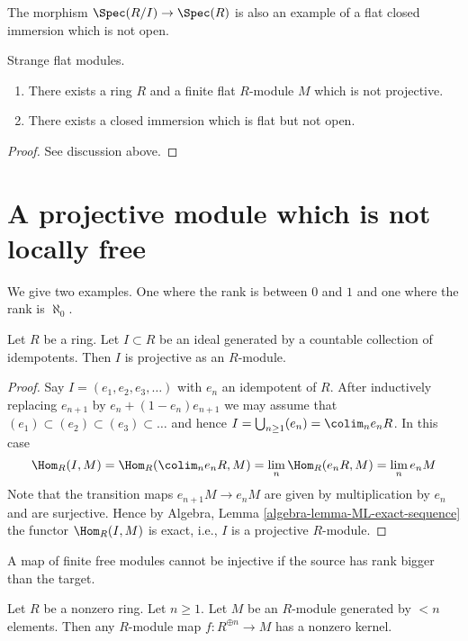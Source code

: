 \medskip\noindent
The morphism $\Spec(R/I) \to \Spec(R)$ is also
an example of a flat closed immersion which is not open.

\begin{lemma}
\label{lemma-finite-flat-non-projective}
Strange flat modules.
\begin{enumerate}
\item There exists a ring $R$ and a finite flat $R$-module $M$ which is
not projective.
\item There exists a closed immersion which is flat but not open.
\end{enumerate}
\end{lemma}

\begin{proof}
See discussion above.
\end{proof}



\section{A projective module which is not locally free}
\label{section-projective-not-locally-free}

\noindent
We give two examples. One where the rank is between $0$ and $1$
and one where the rank is $\aleph_0$.

\begin{lemma}
\label{lemma-ideal-generated-by-idempotents-projective}
Let $R$ be a ring. Let $I \subset R$ be an ideal generated by
a countable collection of idempotents. Then $I$ is projective
as an $R$-module.
\end{lemma}

\begin{proof}
Say $I = (e_1, e_2, e_3, \ldots)$ with $e_n$ an idempotent of $R$.
After inductively replacing $e_{n + 1}$ by $e_n + (1 - e_n)e_{n + 1}$
we may assume that $(e_1) \subset (e_2) \subset (e_3) \subset \ldots$
and hence $I = \bigcup_{n \geq 1} (e_n) = \colim_n e_nR$.
In this case
$$
\Hom_R(I, M) = \Hom_R(\colim_n e_nR, M)
= \lim_n \Hom_R(e_nR, M) = \lim_n e_nM
$$
Note that the transition maps $e_{n + 1}M \to e_nM$ are given
by multiplication by $e_n$ and are surjective. Hence by
Algebra, Lemma \ref{algebra-lemma-ML-exact-sequence}
the functor $\Hom_R(I, M)$ is exact, i.e., $I$ is a projective
$R$-module.
\end{proof}

\begin{lemma}
\label{lemma-map-cannot-be-injective}
\begin{slogan}
A map of finite free modules cannot be injective if the source has
rank bigger than the target.
\end{slogan}
Let $R$ be a nonzero ring. Let $n \geq 1$. Let $M$ be an $R$-module generated
by $< n$ elements. Then any $R$-module map $f : R^{\oplus n} \to M$ has a
nonzero kernel.
\end{lemma}

